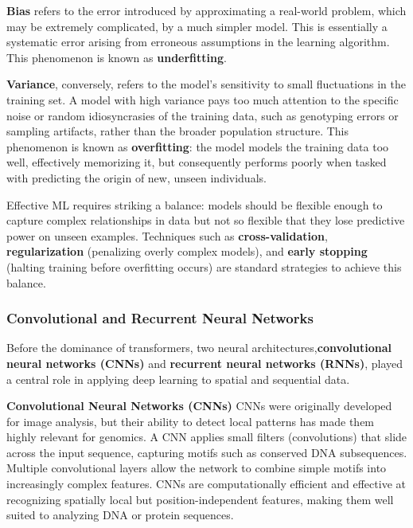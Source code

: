 \textbf{Bias} refers to the error introduced by approximating a real-world problem, which may be extremely complicated, by a much simpler model. This is essentially a systematic error arising from erroneous assumptions in the learning algorithm. This phenomenon is known as \textbf{underfitting}.

\textbf{Variance}, conversely, refers to the model's sensitivity to small fluctuations in the training set. A model with high variance pays too much attention to the specific noise or random idiosyncrasies of the training data, such as genotyping errors or sampling artifacts, rather than the broader population structure. This phenomenon is known as \textbf{overfitting}: the model models the training data too well, effectively memorizing it, but consequently performs poorly when tasked with predicting the origin of new, unseen individuals.

Effective ML requires striking a balance: models should be flexible enough to capture complex relationships in data but not so flexible that they lose predictive power on unseen examples. Techniques such as \textbf{cross-validation}, \textbf{regularization} \cite{srivastava2014dropout} (penalizing overly complex models), and \textbf{early stopping} (halting training before overfitting occurs) are standard strategies to achieve this balance.

\subsubsection{Convolutional and Recurrent Neural Networks}

Before the dominance of transformers, two neural architectures,\textbf{convolutional neural networks (CNNs)} and \textbf{recurrent neural networks (RNNs)}, played a central role in applying deep learning to spatial and sequential data.

\textbf{Convolutional Neural Networks (CNNs)} \cite{krizhevsky2012imagenet} CNNs were originally developed for image analysis, but their ability to detect local patterns has made them highly relevant for genomics. A CNN applies small filters (convolutions) that slide across the input sequence, capturing motifs such as conserved DNA subsequences. Multiple convolutional layers allow the network to combine simple motifs into increasingly complex features. CNNs are computationally efficient and effective at recognizing spatially local but position-independent features, making them well suited to analyzing DNA or protein sequences.

